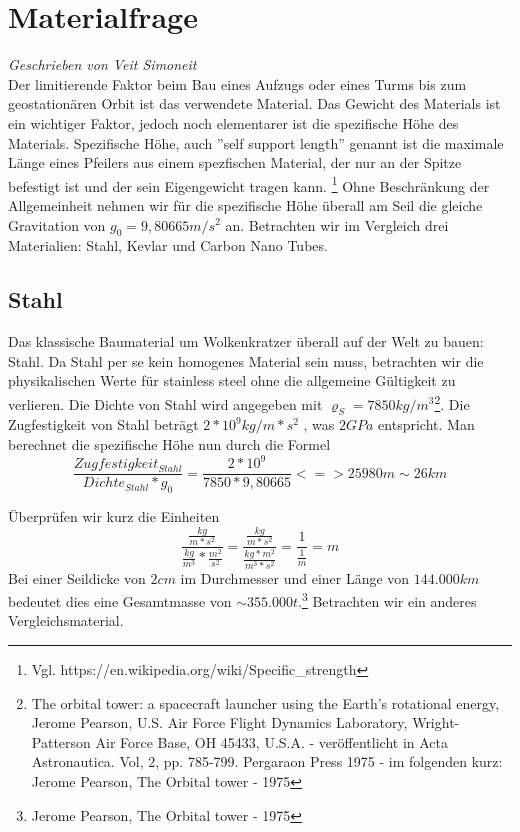 \documentclass[a4paper, 10pt]{report}
\begin{document}
\section{Materialfrage}
\textsl{Geschrieben von Veit Simoneit}\\
Der limitierende Faktor beim Bau eines Aufzugs oder eines Turms bis zum geostationären Orbit ist das verwendete Material. Das Gewicht des Materials ist ein wichtiger Faktor, jedoch noch elementarer ist die spezifische Höhe des Materials. Spezifische Höhe, auch ''self support length'' genannt ist die maximale Länge eines Pfeilers aus einem spezfischen Material, der nur an der Spitze befestigt ist und der sein Eigengewicht tragen kann. \footnote{Vgl. https://en.wikipedia.org/wiki/Specific\_strength} Ohne Beschränkung der Allgemeinheit nehmen wir für die spezifische Höhe überall am Seil die gleiche Gravitation von $g_0 = 9,80665 m/s^2$ an.
Betrachten wir im Vergleich drei Materialien: Stahl, Kevlar und Carbon Nano Tubes.
\subsection{Stahl}
Das klassische Baumaterial um Wolkenkratzer überall auf der Welt zu bauen: Stahl. Da Stahl per se kein homogenes Material sein muss, betrachten wir die physikalischen Werte für stainless steel ohne die allgemeine Gültigkeit zu verlieren. Die Dichte von Stahl wird angegeben mit $\varrho_S = 7850 kg/m^3$\footnote{The orbital tower: a spacecraft launcher using the Earth's rotational energy, Jerome Pearson, U.S. Air Force Flight Dynamics Laboratory, Wright-Patterson Air Force Base, OH 45433, U.S.A. - veröffentlicht in Acta Astronautica. Vol, 2, pp. 785-799. Pergaraon Press 1975 - im folgenden kurz: Jerome Pearson, The Orbital tower - 1975}. Die Zugfestigkeit von Stahl beträgt $2*10^9 kg/m*s^2$ , was $2GPa$ entspricht. Man berechnet die spezifische Höhe nun durch die Formel 
\begin{equation}
\frac{Zugfestigkeit_{Stahl}}{Dichte_{Stahl}*g_0} = \frac{2*10^9}{7850*9,80665}
<=> 25 980 m \sim 26 km 
\end{equation}

Überprüfen wir kurz die Einheiten
\begin{equation}
\frac{\frac{kg}{m*s^2}}{\frac{kg}{m^3}*\frac{m^2}{s^2}}= \frac{\frac{kg}{m*s^2}}{\frac{kg*m^2}{m^3*s^2}} = \frac{1}{\frac{1}{m}} = m
\end{equation}
Bei einer Seildicke von $2 cm$ im Durchmesser und einer Länge von $144.000 km$ bedeutet dies eine Gesamtmasse von $\sim 355.000 t$.\footnote{Jerome Pearson, The Orbital tower - 1975}
Betrachten wir ein anderes Vergleichsmaterial.
\end{document}
